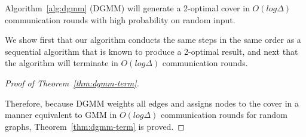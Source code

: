 \begin{thm}
  Algorithm~\ref{alg:dgmm} (DGMM) will generate a 2-optimal cover in $O(log \Delta)$ communication rounds with high probability on random input.
\label{thm:dgmm-term}
\end{thm}
\begin{smy}
We show first that our algorithm conducts the same steps in the same order as a sequential algorithm that is known to produce a 2-optimal result, and next that the algorithm will terminate in $O(log \Delta)$ communication rounds.
\end{smy} 


\begin{proof}[Proof of Theorem~\ref{thm:dgmm-term}]
\label{prf:correct}




Therefore, because DGMM weights all edges and assigns nodes to the cover in a manner equivalent to GMM in $O(log \Delta)$ communication rounds for random graphs, Theorem~\ref{thm:dgmm-term} is proved.
\end{proof}
